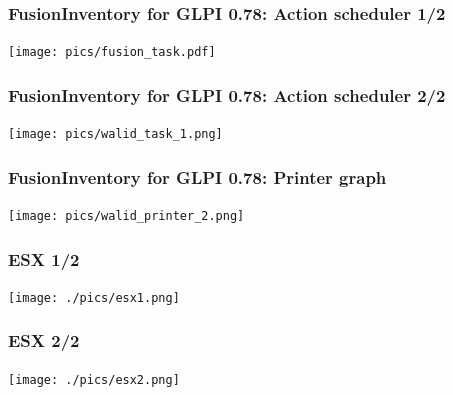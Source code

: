 \documentclass{beamer}
\begin{document}
\begin{frame}
\frametitle{FusionInventory for GLPI 0.78: Action scheduler 1/2}
    \texttt{[image: pics/fusion\_task.pdf]}
\end{frame}

\begin{frame}
\frametitle{FusionInventory for GLPI 0.78: Action scheduler 2/2}
    \texttt{[image: pics/walid\_task\_1.png]}
\end{frame}

\begin{frame}
\frametitle{FusionInventory for GLPI 0.78: Printer graph}
    \texttt{[image: pics/walid\_printer\_2.png]}
\end{frame}
%



\begin{frame}
\frametitle{ESX 1/2}


   \texttt{[image: ./pics/esx1.png]}
\end{frame}
%
\begin{frame}
\frametitle{ESX 2/2}


   \texttt{[image: ./pics/esx2.png]}
\end{frame}

%
%
\end{document}
